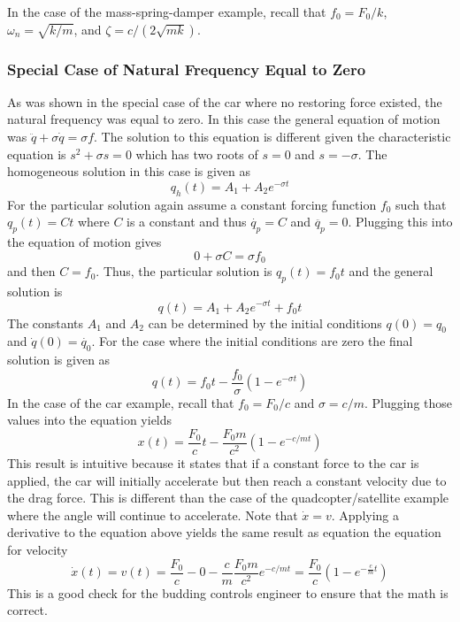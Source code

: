 In the case of the mass-spring-damper example, recall that $f_0=F_0/k$, $\omega_n = \sqrt{k/m}$, and $\zeta = c/(2\sqrt{mk})$.

\subsubsection{Special Case of Natural Frequency Equal to Zero}

As was shown in the special case of the car where no restoring force existed, the natural frequency was equal to zero. In this case the general equation of motion was $\ddot{q} + \sigma \dot{q} = \sigma f$. The solution to this equation is different given the characteristic equation is $s^2+\sigma s=0$ which has two roots of $s=0$ and $s=-\sigma$. The homogeneous solution in this case is given as 
\begin{equation}
    q_h(t) = A_1 + A_2 e^{-\sigma t}
\end{equation}
For the particular solution again assume a constant forcing function $f_0$ such that $q_p(t)=C t$ where $C$ is a constant and thus $\dot{q_p}=C$ and $\ddot{q_p}=0$. Plugging this into the equation of motion gives
\begin{equation}
    0 + \sigma C = \sigma f_0
\end{equation}
and then $C = f_0$. Thus, the particular solution is $q_p(t)=f_0 t$ and the general solution is
\begin{equation}
    q(t) = A_1 + A_2 e^{-\sigma t} + f_0 t
\end{equation} 
The constants $A_1$ and $A_2$ can be determined by the initial conditions $q(0)=q_0$ and $\dot{q}(0)=\dot{q_0}$. For the case where the initial conditions are zero the final solution is given as 
\begin{equation}
    q(t) = f_0 t - \frac{f_0}{\sigma} (1 - e^{-\sigma t})
\end{equation}
In the case of the car example, recall that $f_0 = F_0/c$ and $\sigma = c/m$. Plugging those values into the equation yields 
\begin{equation}
    x(t) = \frac{F_0}{c} t - \frac{F_0 m}{c^2} (1 - e^{-c/m t})
\end{equation}
This result is intuitive because it states that if a constant force to the car is applied, the car will initially accelerate but then reach a constant velocity due to the drag force. This is different than the case of the quadcopter/satellite example where the angle will continue to accelerate. Note that $\dot{x} = v$. Applying a derivative to the equation above yields the same result as equation the equation for velocity
\begin{equation}
    \dot{x}(t) = v(t) = \frac{F_0}{c} - 0 - \frac{c}{m}\frac{F_0 m}{c^2} e^{-c/m t} = \frac{F_0}{c}\left(1 - e^{-\frac{c}{m}t}\right)
\end{equation}
This is a good check for the budding controls engineer to ensure that the math is correct. 

